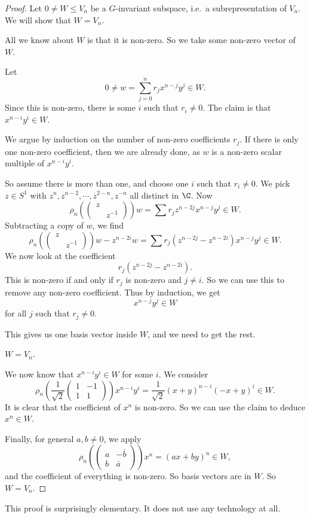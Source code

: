 \documentclass[a4paper]{article}
\begin{document}
\begin{proof}
  Let $0 \not= W \leq V_n$ be a $G$-invariant subspace, i.e.\ a subrepresentation of $V_n$. We will show that $W = V_n$.

  All we know about $W$ is that it is non-zero. So we take some non-zero vector of $W$.
  \begin{claim}
    Let
    \[
      0 \not= w = \sum_{j = 0}^n r_j x^{n - j}y^j \in W.
    \]
    Since this is non-zero, there is some $i$ such that $r_i \not= 0$. The claim is that $x^{n - i}y^i \in W$.
  \end{claim}
  We argue by induction on the number of non-zero coefficients $r_j$. If there is only one non-zero coefficient, then we are already done, as $w$ is a non-zero scalar multiple of $x^{n - i}y^i$.

  So assume there is more than one, and choose one $i$ such that $r_i \not= 0$. We pick $z \in S^1$ with $z^n, z^{n - 2}, \cdots, z^{2 - n}, z^{-n}$ all distinct in $\C$. Now
  \[
    \rho_n\left(
    \begin{pmatrix}
      z\\&z^{-1}
    \end{pmatrix}\right)w = \sum r_j z^{n - 2j} x^{n - j}y^j \in W.
  \]
  Subtracting a copy of $w$, we find
  \[
    \rho_n\left(
    \begin{pmatrix}
      z\\&z^{-1}
    \end{pmatrix}\right)w - z^{n - 2i}w = \sum r_j (z^{n - 2j} - z^{n - 2i})x^{n - j}y^j \in W.
  \]
  We now look at the coefficient
  \[
    r_j (z^{n - 2j} - z^{n - 2i}).
  \]
  This is non-zero if and only if $r_j$ is non-zero and $j \not= i$. So we can use this to remove any non-zero coefficient. Thus by induction, we get
  \[
    x^{n - j}y^j \in W
  \]
  for all $j$ such that $r_j \not= 0$.

  This gives us one basis vector inside $W$, and we need to get the rest.

  \begin{claim}
    $W = V_n$.
  \end{claim}
  We now know that $x^{n - i}y^i \in W$ for some $i$. We consider
  \[
    \rho_n\left(\frac{1}{\sqrt{2}}
    \begin{pmatrix}
      1 & -1\\
      1 & 1
    \end{pmatrix}\right) x^{n - i}y^i = \frac{1}{\sqrt{2}} (x + y)^{n - i}(-x + y)^i \in W.
  \]
  It is clear that the coefficient of $x^n$ is non-zero. So we can use the claim to deduce $x^n \in W$.

  Finally, for general $a, b \not= 0$, we apply
  \[
    \rho_n\left(
    \begin{pmatrix}
      a & -\bar{b}\\
      b &\bar{a}
    \end{pmatrix}\right) x^n = (ax + by)^n \in W,
  \]
  and the coefficient of everything is non-zero. So basis vectors are in $W$. So $W = V_n$.
\end{proof}
This proof is surprisingly elementary. It does not use any technology at all.
\end{document}
